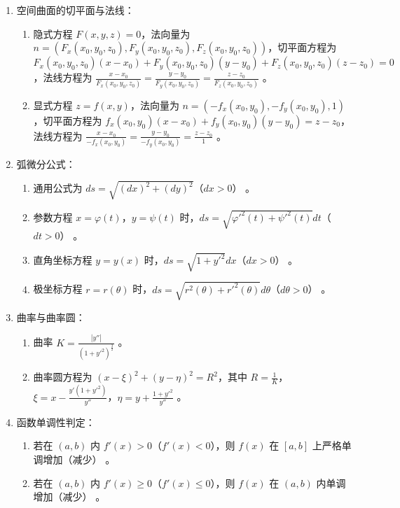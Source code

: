 \documentclass[UTF8]{ctexart}
\theoremstyle{remark}
\begin{document}
\begin{enumerate}
	\item 空间曲面的切平面与法线：
	\begin{enumerate}
		\item 隐式方程 \(F(x, y, z) = 0\)，法向量为 \(n = (F_x(x_0, y_0, z_0), F_y(x_0, y_0, z_0), F_z(x_0, y_0, z_0))\)，切平面方程为 \(F_x(x_0, y_0, z_0)(x - x_0) + F_y(x_0, y_0, z_0)(y - y_0) + F_z(x_0, y_0, z_0)(z - z_0) = 0\)，法线方程为 \(\frac{x - x_0}{F_x(x_0, y_0, z_0)} = \frac{y - y_0}{F_y(x_0, y_0, z_0)} = \frac{z - z_0}{F_z(x_0, y_0, z_0)}\) 。
		\item 显式方程 \(z = f(x, y)\)，法向量为 \(n = (-f_x(x_0, y_0), -f_y(x_0, y_0), 1)\)，切平面方程为 \(f_x(x_0, y_0)(x - x_0) + f_y(x_0, y_0)(y - y_0) = z - z_0\)，法线方程为 \(\frac{x - x_0}{-f_x(x_0, y_0)} = \frac{y - y_0}{-f_y(x_0, y_0)} = \frac{z - z_0}{1}\) 。
	\end{enumerate}
	
	\item 弧微分公式：
	\begin{enumerate}
		\item 通用公式为 \(ds = \sqrt{(dx)^2 + (dy)^2}\)（\(dx > 0\)） 。
		\item 参数方程 \(x = \varphi(t)\)，\(y = \psi(t)\) 时，\(ds = \sqrt{\varphi'^2(t) + \psi'^2(t)}dt\)（\(dt > 0\)） 。
		\item 直角坐标方程 \(y = y(x)\) 时，\(ds = \sqrt{1 + y'^2}dx\)（\(dx > 0\)） 。
		\item 极坐标方程 \(r = r(\theta)\) 时，\(ds = \sqrt{r^2(\theta) + r'^2(\theta)}d\theta\)（\(d\theta > 0\)） 。
	\end{enumerate}
	
	\item 曲率与曲率圆：
	\begin{enumerate}
		\item 曲率 \(K = \frac{|y''|}{(1 + y'^2)^{\frac{3}{2}}}\) 。
		\item 曲率圆方程为 \((x - \xi)^2 + (y - \eta)^2 = R^2\)，其中 \(R = \frac{1}{K}\)，\(\xi = x - \frac{y'(1 + y'^2)}{y''}\)，\(\eta = y + \frac{1 + y'^2}{y''}\) 。
	\end{enumerate}
	
	\item 函数单调性判定：
	\begin{enumerate}
		\item 若在 \((a, b)\) 内 \(f'(x) > 0\)（\(f'(x) < 0\)），则 \(f(x)\) 在 \([a, b]\) 上严格单调增加（减少） 。
		\item 若在 \((a, b)\) 内 \(f'(x) \geq 0\)（\(f'(x) \leq 0\)），则 \(f(x)\) 在 \((a, b)\) 内单调增加（减少） 。
	\end{enumerate}
	

\end{enumerate}
\end{document}
